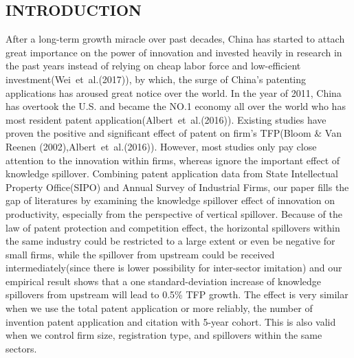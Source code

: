 \documentclass[12pt]{article}%
\begin{document}
\begin{CJK*}{GBK}{fs}
\newpage



\section{INTRODUCTION}
 After a long-term growth miracle over past decades, China has started to attach great importance on the power of innovation and invested heavily in research in the past years instead of relying on cheap labor force and low-efficient investment(\textcolor[rgb]{0.00,0.07,1.00}{Wei~et~al.(2017)}), by which, the surge of China's patenting applications has aroused great notice over the world. In the year of 2011, China has overtook the U.S. and became the NO.1 economy all over the world who has most resident patent application(\textcolor[rgb]{0.00,0.07,1.00}{Albert~et~al.(2016)}). Existing studies have proven the positive and significant effect of patent on firm's TFP(\textcolor[rgb]{0.00,0.07,1.00}{Bloom \& Van Reenen (2002)},\textcolor[rgb]{0.00,0.07,1.00}{Albert~et~al.(2016)}). However, most studies only pay close attention to the innovation within firms, whereas ignore the important effect of knowledge spillover. Combining patent application data from State Intellectual Property Office(SIPO) and Annual Survey of Industrial Firms, our paper fills the gap of literatures by examining the knowledge spillover effect of innovation on productivity, especially from the perspective of vertical spillover. Because of the law of patent protection and competition effect, the horizontal spillovers within the same industry could be restricted to a large extent or even be negative for small firms, while the spillover from upstream could be received intermediately(since there is lower possibility for inter-sector imitation) and our empirical result shows that a one standard-deviation increase of knowledge spillovers from upstream will lead to 0.5\% TFP growth. The effect is very similar when we use the total patent application or more reliably, the number of invention patent application and citation with 5-year cohort. This is also valid when we control firm size, registration type, and spillovers within the same sectors.  \par

\end{CJK*}
\end{document}
